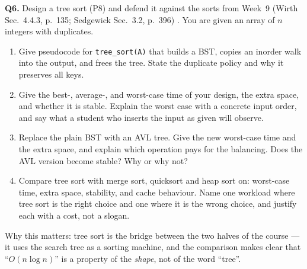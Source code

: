 \documentclass[11pt]{article}
\begin{document}
\textbf{Q6.} Design a tree sort (P8) and defend it against the sorts from Week~9 (Wirth Sec.~4.4.3, p.~135; Sedgewick Sec.~3.2, p.~396) \cite{Wirth2004_algorithms_data_structures,Sedgewick2011_algorithms}. You are given an array of $n$ integers with duplicates.
\begin{enumerate}
  \item[(a)] Give pseudocode for \texttt{tree\_sort(A)} that builds a BST, copies an inorder walk into the output, and frees the tree. State the duplicate policy and why it preserves all keys.
  \item[(b)] Give the best-, average-, and worst-case time of your design, the extra space, and whether it is stable. Explain the worst case with a concrete input order, and say what a student who inserts the input as given will observe.
  \item[(c)] Replace the plain BST with an AVL tree. Give the new worst-case time and the extra space, and explain which operation pays for the balancing. Does the AVL version become stable? Why or why not?
  \item[(d)] Compare tree sort with merge sort, quicksort and heap sort on: worst-case time, extra space, stability, and cache behaviour. Name one workload where tree sort is the right choice and one where it is the wrong choice, and justify each with a cost, not a slogan.
\end{enumerate}
Why this matters: tree sort is the bridge between the two halves of the course --- it uses the search tree as a sorting machine, and the comparison makes clear that ``$O(n\log n)$'' is a property of the \emph{shape}, not of the word ``tree''.



\end{document}
